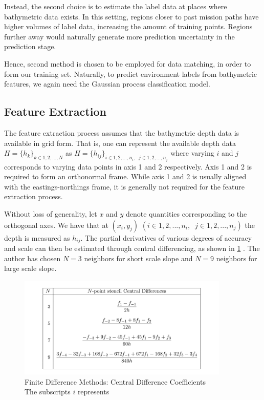			Instead, the second choice is to estimate the label data at places where bathymetric data exists. In this setting, regions closer to past mission paths have higher volumes of label data, increasing the amount of training points. Regions further away would naturally generate more prediction uncertainty in the prediction stage.
			
			Hence, second method is chosen to be employed for data matching, in order to form our training set. Naturally, to predict environment labels from bathymetric features, we again need the Gaussian process classification model.
			
			\FloatBarrier
	
		\subsection{Feature Extraction}
		\label{Background:OceanEnvironmentModeling:FeatureExtraction}
		
			The feature extraction process assumes that the bathymetric depth data is available in grid form. That is, one can represent the available depth data $H = \{h_{k}\}_{k \in {1, 2, ..., N}}$ as $H = \{h_{ij}\}_{i \in {1, 2, ..., n_{i}}, \;\; j \in {1, 2, ..., n_{j}}}$ where varying $i$ and $j$ corresponds to varying data points in axis 1 and 2 respectively. Axis 1 and 2 is required to form an orthonormal frame. While axis 1 and 2 is usually aligned with the eastings-northings frame, it is generally not required for the feature extraction process.
			
			Without loss of generality, let $x$ and $y$ denote quantities corresponding to the orthogonal axes. We have that at $(x_{i}, y_{j})$ $(i \in {1, 2, ..., n_{i}}, \;\; j \in {1, 2, ..., n_{j}})$ the depth is measured as $h_{ij}$. The partial derivatives of various degrees of accuracy and scale can then be estimated through central differencing, as shown in \cref{Background:OceanEnvironmentModeling:Figure:centraldifferencecofficients} \cite{CentralDifferenceTable}. The author has chosen $N = 3$ neighbors for short scale slope and $N = 9$ neighbors for large scale slope.
			
			\begin{figure}[!htbp]
				\centering
					\includegraphics[width=0.9\textwidth]{Figures/centraldifferencecofficients.png}
				\caption{Finite Difference Methods: Central Difference Coefficients \\
				The subscripts $i$ represents  }
				\label{Background:OceanEnvironmentModeling:Figure:centraldifferencecofficients}
			\end{figure}			

